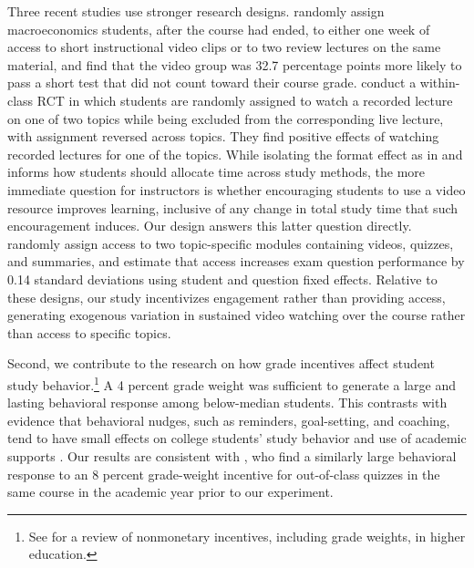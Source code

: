 Three recent studies use stronger research designs.
\textcite{exposito2020} randomly assign macroeconomics students, after the course had ended, to either one week of access to short instructional video clips or to two review lectures on the same material, and find that the video group was 32.7 percentage points more likely to pass a short test that did not count toward their course grade.
\textcite{artz2022live} conduct a within-class RCT in which students are randomly assigned to watch a recorded lecture on one of two topics while being excluded from the corresponding live lecture, with assignment reversed across topics.
They find positive effects of watching recorded lectures for one of the topics.
While isolating the format effect as in \textcite{artz2022live} and \textcite{exposito2020} informs how students should allocate time across study methods, the more immediate question for instructors is whether encouraging students to use a video resource improves learning, inclusive of any change in total study time that such encouragement induces.
Our design answers this latter question directly.
\textcite{aflsm2024} randomly assign access to two topic-specific modules containing videos, quizzes, and summaries, and estimate that access increases exam question performance by 0.14 standard deviations using student and question fixed effects.
Relative to these designs, our study incentivizes engagement rather than providing access, generating exogenous variation in sustained video watching over the course rather than access to specific topics.

Second, we contribute to the research on how grade incentives affect student study behavior.\footnote{See \textcite{sw2020} for a review of nonmonetary incentives, including grade weights, in higher education.}
A 4 percent grade weight was sufficient to generate a large and lasting behavioral response among below-median students.
This contrasts with evidence that behavioral nudges, such as reminders, goal-setting, and coaching, tend to have small effects on college students' study behavior and use of academic supports \parencite{oppp2019, pmlg2026, pw2024}.
Our results are consistent with \textcite{afg2026}, who find a similarly large behavioral response to an 8 percent grade-weight incentive for out-of-class quizzes in the same course in the academic year prior to our experiment.

